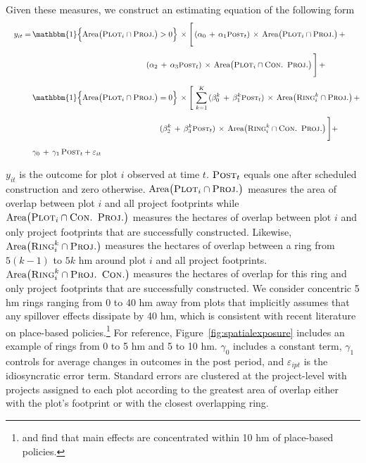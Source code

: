 \documentclass[12pt]{article}
\begin{document}
Given these measures, we construct an estimating equation of the following form
\begin{align}
\label{eq:main}
\begin{split}
\quad y_{it}  =\,&\mathbbm{1}\Big\{\text{Area}\big(\textsc{Plot}_i  \cap  \textsc{Proj.}\big)>0\Big \}\,\times \Bigg[ \, ( \alpha_0 \, +  \, \alpha_1 \textsc{\small Post}_{t}) \, \times \, \text{Area}\big(\textsc{Plot}_i  \cap  \textsc{Proj.}\big) \, + \\[.5em]
&\hspace{14.5em}( \alpha_2 \, +  \, \alpha_3 \textsc{\small Post}_{t})  \, \times \, \text{Area}\big(\textsc{Plot}_i \cap \textsc{Con. Proj.}\big)\, \Bigg] \, + \\[.7em]
&\mathbbm{1}\Big\{\text{Area}\big(\textsc{Plot}_i  \cap  \textsc{Proj.}\big)=0\Big \}\,\times \Bigg[ \, \sum_{k=1}^{K} \, (\beta_{0}^{k} \,+\, \beta_{1}^{k} \textsc{\small Post}_{t})  \, \times \, \text{Area}\big(\textsc{Ring}_i^{k}  \cap  \textsc{Proj.}\big) \, + \\[.5em]
&\hspace{16.2em}(\beta_{2}^{k} \,+\, \beta_{3}^{k} \textsc{\small Post}_{t})  \, \times \,\text{Area}\big(\textsc{Ring}_i^{k}  \cap \textsc{Con. Proj.}\big)\, \Bigg]  +  \\[.5em]
&\gamma_0 \,+\, \gamma_1 \, \textsc{Post}_t + \varepsilon_{it}
\end{split}
\end{align}

\noindent $y_{it}$ is the outcome for plot $i$ observed at time $t$.  $\textsc{Post}_{t}$ equals one after scheduled construction and zero otherwise.  $\text{Area}\big(\textsc{Plot}_i  \cap  \textsc{Proj.}\big)$ measures the area of overlap between plot $i$ and all project footprints while $\text{Area}\big(\textsc{Plot}_i \cap \textsc{Con. Proj.}\big)$ measures the hectares of overlap between plot $i$ and only project footprints that are successfully constructed.  Likewise, $\text{Area}\big(\textsc{Ring}_i^{k}  \cap  \textsc{Proj.}\big)$ measures the  hectares of overlap between a ring from $5(k-1)$ to $5k$ hm around plot $i$ and all project footprints.   $\text{Area}\big(\textsc{Ring}_i^{k}  \cap  \textsc{Proj. Con.}\big)$ measures the hectares of overlap for this ring and only project footprints that are successfully constructed.  We consider concentric 5 hm rings ranging from 0 to 40 hm away from plots that implicitly assumes that any spillover effects dissipate by 40 hm, which is consistent with recent literature on place-based policies.\footnote{\cite{diamond2016wants} and \cite{rossi2010housing} find that main effects are concentrated within 10 hm of place-based policies.}  For reference, Figure~\ref{fig:spatialexposure} includes an example of rings from 0 to 5 hm and 5 to 10 hm.  $\gamma_0$ includes a constant term, $\gamma_1$ controls for average changes in outcomes in the post period, and $\varepsilon_{ipt}$ is the idiosyncratic error term.  Standard errors are clustered at the project-level with projects assigned to each plot according to the greatest area of overlap either with the plot's footprint or with the closest overlapping ring.  
\end{document}
